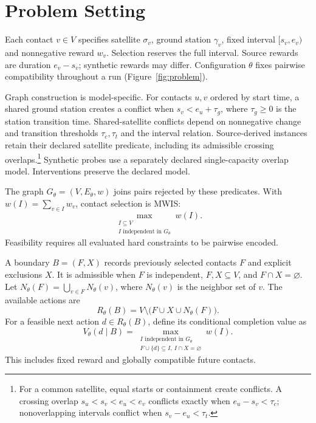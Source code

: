 \section{Problem Setting}
\label{sec:problem}

Each contact $v\in V$ specifies satellite $\sigma_v$, ground station
$\gamma_v$, fixed interval $[s_v,e_v)$ and nonnegative reward $w_v$.
Selection reserves the full interval. Source rewards are duration
$e_v-s_v$; synthetic rewards may differ. Configuration $\theta$ fixes pairwise
compatibility throughout a run (Figure~\ref{fig:problem}).

Graph construction is model-specific. For contacts $u,v$ ordered by start
time, a shared ground station creates a conflict when $s_v<e_u+\tau_g$,
where $\tau_g\geq0$ is the station transition time.
Shared-satellite conflicts depend on nonnegative change and transition
thresholds $\tau_c,\tau_t$ and the interval relation.
Source-derived instances retain their declared satellite predicate,
including its admissible crossing overlaps.\footnote{For a common satellite,
equal starts or containment create conflicts. A crossing overlap
$s_u<s_v<e_u<e_v$ conflicts exactly when $e_u-s_v<\tau_c$;
nonoverlapping intervals conflict when $s_v-e_u<\tau_t$.}
Synthetic probes use a separately declared single-capacity overlap model.
Interventions preserve the declared model.

The graph $G_\theta=(V,E_\theta,w)$ joins pairs rejected by these predicates.
With $w(I)=\sum_{v\in I}w_v$, contact selection is MWIS:
\begin{equation}
 \max_{\substack{I\subseteq V\\
                 I\text{ independent in }G_\theta}}w(I).
 \label{eq:mwis}
\end{equation}
Feasibility requires all evaluated hard constraints to be pairwise encoded.

A boundary $B=(F,X)$ records previously selected contacts $F$ and explicit
exclusions $X$. It is admissible when $F$ is independent,
$F,X\subseteq V$, and $F\cap X=\varnothing$. Let
$N_\theta(F)=\bigcup_{v\in F}N_\theta(v)$, where $N_\theta(v)$ is the
neighbor set of $v$. The available actions are
\begin{equation}
 R_\theta(B)=V\setminus\bigl(F\cup X\cup N_\theta(F)\bigr).
 \label{eq:residual}
\end{equation}
For a feasible next action $d\in R_\theta(B)$, define its conditional
completion value as
\begin{equation}
 V_\theta(d\mid B)=
 \max_{\substack{I\text{ independent in }G_\theta\\
                 F\cup\{d\}\subseteq I,\ I\cap X=\varnothing}}w(I).
 \label{eq:conditional-value}
\end{equation}
This includes fixed reward and globally compatible future contacts.

